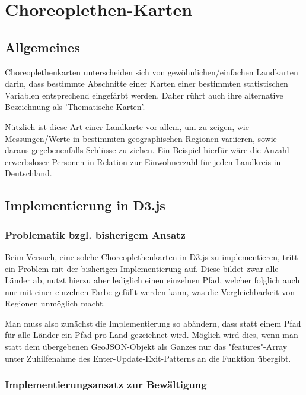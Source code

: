 \chapter{Choreoplethen-Karten}
\label{choreopleth}

\nocite{blocksmercator:2018}
\nocite{blockscolombia:2018}

\section{Allgemeines}
\label{sec:choreopleth-abstract}

Choreoplethenkarten unterscheiden sich von gewöhnlichen/einfachen Landkarten darin, dass bestimmte Abschnitte einer Karten einer bestimmten statistischen Variablen entsprechend eingefärbt werden. Daher rührt auch ihre alternative Bezeichnung als 'Thematische Karten'.

Nützlich ist diese Art einer Landkarte vor allem, um zu zeigen, wie Messungen/Werte in bestimmten geographischen Regionen variieren, sowie daraus gegebenenfalls Schlüsse zu ziehen. Ein Beispiel hierfür wäre die Anzahl erwerbsloser Personen in Relation zur Einwohnerzahl für jeden Landkreis in Deutschland.

\section{Implementierung in D3.js}
\label{sec:choreopleth-implementation}

\subsection{Problematik bzgl. bisherigem Ansatz}

Beim Versuch, eine solche Choreoplethenkarten in D3.js zu implementieren, tritt ein Problem mit der bisherigen Implementierung auf. Diese bildet zwar alle Länder ab, nutzt hierzu aber lediglich einen einzelnen Pfad, welcher folglich auch nur mit einer einzelnen Farbe gefüllt werden kann, was die Vergleichbarkeit von Regionen unmöglich macht.

Man muss also zunächst die Implementierung so abändern, dass statt einem Pfad für alle Länder ein Pfad pro Land gezeichnet wird. Möglich wird dies, wenn man statt dem übergebenen GeoJSON-Objekt als Ganzes nur das "features"-Array unter Zuhilfenahme des Enter-Update-Exit-Patterns an die Funktion übergibt.

\subsection{Implementierungsansatz zur Bewältigung}

